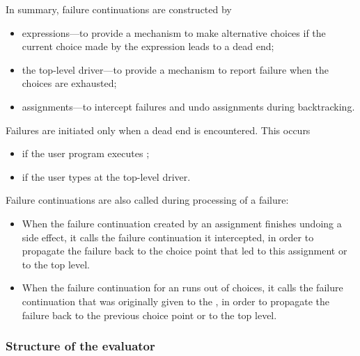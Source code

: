 \enlargethispage{\baselineskip}

In summary, failure continuations are constructed by

\begin{itemize}

\item
{} expressions---to provide a mechanism to make alternative choices if
the current choice made by the  expression leads to a dead end;

\item
the top-level driver---to provide a mechanism to report failure when the
choices are exhausted;

\item
assignments---to intercept failures and undo assignments during backtracking.

\end{itemize}

\noindent
Failures are initiated only when a dead end is encountered.  This occurs

\begin{itemize}

\item
if the user program executes ;

\item
if the user types  at the top-level driver.

\end{itemize}

\noindent
Failure continuations are also called during processing of a failure:

\begin{itemize}

\item
When the failure continuation created by an assignment finishes undoing a side
effect, it calls the failure continuation it intercepted, in order to propagate
the failure back to the choice point that led to this assignment or to the top
level.

\item
When the failure continuation for an  runs out of choices, it calls
the failure continuation that was originally given to the , in order
to propagate the failure back to the previous choice point or to the top level.

\end{itemize}

\subsubsection*{Structure of the evaluator}

